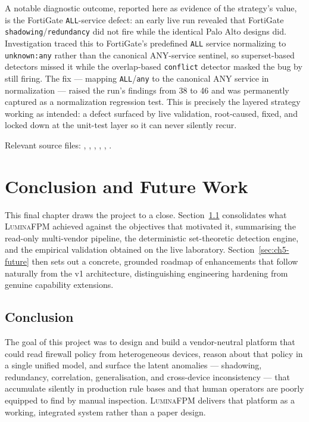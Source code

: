 \documentclass[12pt,a4paper]{report}
\renewcommand{\_}{\textunderscore\allowbreak}
\begin{document}
A notable diagnostic outcome, reported here as evidence of the strategy's value, is the FortiGate \texttt{ALL}-service defect: an early live run revealed that FortiGate \texttt{shadowing}/\texttt{redundancy} did not fire while the identical Palo Alto designs did. Investigation traced this to FortiGate's predefined \texttt{ALL} service normalizing to \texttt{unknown:any} rather than the canonical ANY-service sentinel, so superset-based detectors missed it while the overlap-based \texttt{conflict} detector masked the bug by still firing. The fix --- mapping \texttt{ALL}/\texttt{any} to the canonical ANY service in normalization --- raised the run's findings from 38 to 46 and was permanently captured as a normalization regression test. This is precisely the layered strategy working as intended: a defect surfaced by live validation, root-caused, fixed, and locked down at the unit-test layer so it can never silently recur.

Relevant source files: , , , , , .

\chapter{Conclusion and Future Work}
\label{sec:ch5-intro}

This final chapter draws the project to a close. Section~\ref{sec:ch5-conclusion} consolidates what \textsc{LuminaFPM} achieved against the objectives that motivated it, summarising the read-only multi-vendor pipeline, the deterministic set-theoretic detection engine, and the empirical validation obtained on the live laboratory. Section~\ref{sec:ch5-future} then sets out a concrete, grounded roadmap of enhancements that follow naturally from the v1 architecture, distinguishing engineering hardening from genuine capability extensions.

\section{Conclusion}
\label{sec:ch5-conclusion}

The goal of this project was to design and build a vendor-neutral platform that could read firewall policy from heterogeneous devices, reason about that policy in a single unified model, and surface the latent anomalies --- shadowing, redundancy, correlation, generalisation, and cross-device inconsistency --- that accumulate silently in production rule bases and that human operators are poorly equipped to find by manual inspection. \textsc{LuminaFPM} delivers that platform as a working, integrated system rather than a paper design.
\end{document}
